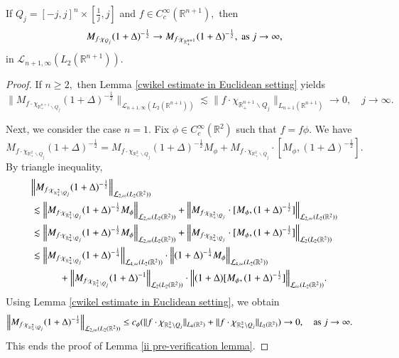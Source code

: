 \documentclass[12pt]{amsart}
\begin{document}
\begin{lemma}\label{ii pre-verification lemma} If $Q_j=[-j,j]^n\times[\frac1j,j]$ and $f\in C^{\infty}_c(\mathbb{R}^{n+1}),$ then
$$M_{f\cdot\chi_{Q_j}}(1+\Delta)^{-\frac12}\to M_{f\cdot\chi_{\mathbb{R}^{n+1}_+}}(1+\Delta)^{-\frac12},\ {\rm as}\ j\rightarrow \infty,$$
in $\mathcal{L}_{n+1,\infty}(L_2(\mathbb{R}^{n+1})).$
\end{lemma}
\begin{proof} If $n\geq 2,$ then Lemma \ref{cwikel estimate in Euclidean setting} yields
$$\Big\|M_{f\cdot\chi_{\mathbb{R}^{n+1}_+\backslash Q_j}}(1+\Delta)^{-\frac12}\Big\|_{\mathcal{L}_{n+1,\infty}(L_2(\mathbb{R}^{n+1}))}\lesssim\|f\cdot\chi_{\mathbb{R}^{n+1}_+\backslash Q_j}\|_{L_{n+1}(\mathbb{R}^{n+1})}\to0,\quad j\to\infty.$$

Next, we consider the case $n=1.$ Fix $\phi\in C^{\infty}_c(\mathbb{R}^2)$ such that $f=f\phi.$ We have
$$M_{f\cdot\chi_{\mathbb{R}^2_+\backslash Q_j}}(1+\Delta)^{-\frac12}=M_{f\cdot\chi_{\mathbb{R}^2_+\backslash Q_j}}(1+\Delta)^{-\frac12}M_{\phi}+M_{f\cdot\chi_{\mathbb{R}^2_+\backslash Q_j}}\cdot[M_{\phi},(1+\Delta)^{-\frac12}].$$
By triangle inequality,
\begin{align*}
&\Big\|M_{f\cdot\chi_{\mathbb{R}^2_+\backslash Q_j}}(1+\Delta)^{-\frac12}\Big\|_{\mathcal{L}_{2,\infty}(L_2(\mathbb{R}^2))}\\
&\lesssim\Big\|M_{f\cdot\chi_{\mathbb{R}^2_+\backslash Q_j}}(1+\Delta)^{-\frac12}M_{\phi}\Big\|_{\mathcal{L}_{2,\infty}(L_2(\mathbb{R}^2))}+\Big\|M_{f\cdot\chi_{\mathbb{R}^2_+\backslash Q_j}}\cdot[M_{\phi},(1+\Delta)^{-\frac12}]\Big\|_{\mathcal{L}_{2,\infty}(L_2(\mathbb{R}^2))}\\
&\lesssim\Big\|M_{f\cdot\chi_{\mathbb{R}^2_+\backslash Q_j}}(1+\Delta)^{-\frac12}M_{\phi}\Big\|_{\mathcal{L}_{2,\infty}(L_2(\mathbb{R}^2))}+\Big\|M_{f\cdot\chi_{\mathbb{R}^2_+\backslash Q_j}}\cdot[M_{\phi},(1+\Delta)^{-\frac12}]\Big\|_{\mathcal{L}_2(L_2(\mathbb{R}^2))}\\
&\lesssim\Big\|M_{f\cdot\chi_{\mathbb{R}^2_+\backslash Q_j}}(1+\Delta)^{-\frac14}\Big\|_{\mathcal{L}_{4,\infty}(L_2(\mathbb{R}^2))}\cdot \Big\|(1+\Delta)^{-\frac14}M_{\phi}\Big\|_{\mathcal{L}_{4,\infty}(L_2(\mathbb{R}^2))}\\
&\hspace{1.0cm}+\Big\|M_{f\cdot\chi_{\mathbb{R}^2_+\backslash Q_j}}(1+\Delta)^{-1}\Big\|_{\mathcal{L}_2(L_2(\mathbb{R}^2))}\cdot\Big\|(1+\Delta)[M_{\phi},(1+\Delta)^{-\frac12}]\Big\|_{\mathcal{L}_{\infty}(L_2(\mathbb{R}^2))}.
\end{align*}
Using Lemma \ref{cwikel estimate in Euclidean setting}, we obtain
\begin{align*}
\Big\|M_{f\cdot\chi_{\mathbb{R}^2_+\backslash Q_j}}(1+\Delta)^{-\frac12}\Big\|_{\mathcal{L}_{2,\infty}(L_2(\mathbb{R}^2))}
&\leq c_{\phi}(\|f\cdot\chi_{\mathbb{R}^2_+\backslash Q_j}\|_{L_4(\mathbb{R}^2)}+\|f\cdot\chi_{\mathbb{R}^2_+\backslash Q_j}\|_{L_2(\mathbb{R}^2)})\to0,\quad {\rm as}\ j\to\infty.
\end{align*}
This ends the proof of Lemma \ref{ii pre-verification lemma}.
\end{proof}
\end{document}
